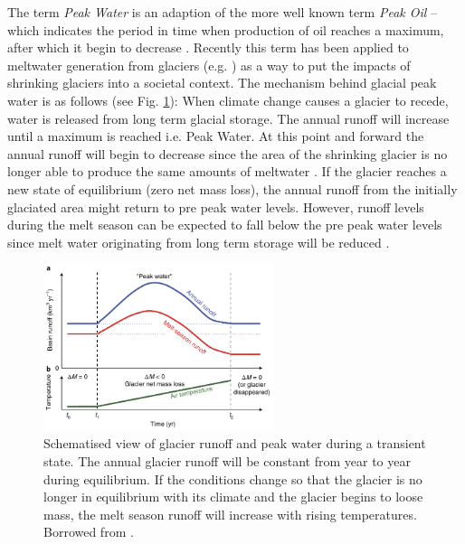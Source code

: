 \documentclass[12pt, a4paper]{article}
\begin{document}
The term \emph{Peak Water} is an adaption of the more well known term \emph{Peak
Oil} -- which indicates the period in time when production of oil reaches a
maximum, after which it begin to decrease \parencite{gleickPeakWaterLimits2010}.
Recently this term has been applied to meltwater generation from glaciers (e.g.
\cite{hussGlobalscaleHydrologicalResponse2018}) as a way to put the impacts of
shrinking glaciers into a societal context. The mechanism behind glacial peak
water is as follows (see Fig. \ref{fig:peak_water}): When climate change causes
a glacier to recede, water is released from long term glacial storage. The
annual runoff will increase until a maximum is reached i.e. Peak Water. At this
point and forward the annual runoff will begin to decrease since the area of the
shrinking glacier is no longer able to produce the same amounts of meltwater
\parencite{janssonConceptGlacierStorage2003}. If the glacier reaches a new state
of equilibrium (zero net mass loss), the annual runoff from the initially
glaciated area might return to pre peak water levels. However, runoff levels
during the melt season can be expected to fall below the pre peak water levels
since melt water originating from long term storage will be reduced
\parencite{hussGlobalscaleHydrologicalResponse2018,
ragettliContrastingClimateChange2016, immerzeelRisingRiverFlows2013}.
\begin{figure}[h]
    \centering
    \includegraphics[width=0.6\textwidth]{../peak_water.png}
    \caption{Schematised view of glacier runoff and peak water during a
    transient state. The annual glacier runoff will be constant from year to
    year during equilibrium. If the conditions change so that the glacier is no
    longer in equilibrium with its climate and the glacier begins to loose mass,
    the melt season runoff will increase with rising temperatures.
    Borrowed from \textcite{hussGlobalscaleHydrologicalResponse2018}.}
    \label{fig:peak_water}
\end{figure}
\end{document}
